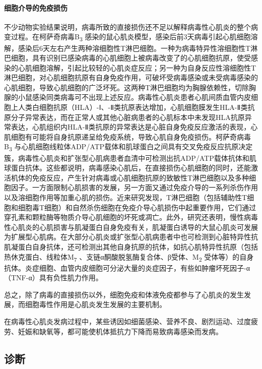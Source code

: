 \paragraph{细胞介导的免疫损伤}

不少动物实验结果说明，病毒所致的直接损伤还不足以解释病毒性心肌炎的整个病变过程。在柯萨奇病毒B\textsubscript{3}
感染的鼠心肌炎模型，感染后前3天病毒引起心肌细胞溶解，感染后6天左右产生两种溶细胞性T淋巴细胞。一种为病毒特异性溶细胞性T淋巴细胞，具有识别已感染病毒的心肌细胞上被病毒改变了的心肌细胞抗原，使受感染的心肌细胞溶解，引起比较轻的心肌炎症反应；另一种为自身反应性溶细胞性T淋巴细胞，对心肌细胞抗原有自身免疫作用，可破坏受病毒感染或未受病毒感染的心肌细胞，导致心肌细胞的广泛坏死。这两种T淋巴细胞均为胸腺依赖性，切除胸腺的小鼠感染同类病毒可不出现上述反应。病毒性心肌炎患者心肌间质血管内皮细胞上人类白细胞抗原（HLA）-Ⅰ、-Ⅱ类抗原表达增加，心肌细胞膜发生HLA-Ⅱ类抗原分子异常表达，而在正常人或其他心脏病患者的心肌标本中未发现HLA抗原异常表达，心肌组织内HLA-Ⅱ类抗原的异常表达是心脏自身免疫反应激活的表现，心肌细胞有可能将自身抗原递呈给免疫系统，导致心肌自身免疫损伤。柯萨奇病毒B\textsubscript{3}
与心肌细胞线粒体ADP/ATP载体和肌球蛋白之间具有交叉免疫反应抗原决定簇，病毒性心肌炎和扩张型心肌病患者血清中可检测出抗ADP/ATP载体抗体和肌球蛋白抗体。这些都说明，病毒感染心肌后，在直接损伤心肌细胞的同时，还能激活机体的免疫反应，产生针对病毒或心肌细胞抗原的致敏性T淋巴细胞以及多种细胞因子。一方面限制心肌损害的发展，另一方面又通过免疫介导的一系列杀伤作用以及溶细胞作用等加重心肌的损伤。近来研究发现，T淋巴细胞（包括辅助性T细胞和细胞毒T细胞）和自然杀伤细胞在免疫介导心肌损伤中起重要作用，它们通过穿孔素和颗粒酶等物质介导心肌细胞的坏死或凋亡。此外，研究还表明，慢性病毒性心肌炎的心肌损害与肌凝蛋白自身免疫有关，肌凝蛋白诱导的大鼠心肌炎可发展为扩展型心肌病。在大部分心肌炎或扩张型心肌病患者中也可检测到心脏特异性抗肌凝蛋白自身抗体，还可检测出其他自身抗原的抗体，如抗心肌特异性抗原（包括热休克蛋白、线粒体M\textsubscript{7}
、支链α酮酸脱氢酶复合体、β受体、M\textsubscript{2}
受体等）的自身抗体。炎症细胞、血管内皮细胞可分泌大量的炎症因子，有些如肿瘤坏死因子-α（TNF-α）具有负性肌力作用。

总之，除了病毒的直接损伤以外，细胞免疫和体液免疫都参与了心肌炎的发生发展，而细胞毒性作用是心肌炎发生发展的主要机制。

在病毒性心肌炎发病过程中，某些诱因如细菌感染、营养不良、剧烈运动、过度疲劳、妊娠和缺氧等，都可能使机体抵抗力下降而易致病毒感染而发病。

\subsection{诊断}

